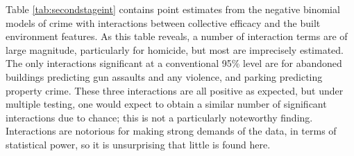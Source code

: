\documentclass [11pt, proquest] {uwthesis}[2015/03/03]
\begin{document}
\begin{longtable}[c]{|p{0.10in}|p{0.80in}|p{0.75in}|p{0.75in}|p{0.75in}|p{0.75in}|p{0.75in}}
Modern Roman})}}} & \multicolumn{1}{!{\color[HTML]{000000}\vrule width 0pt}>{\centering}p{\dimexpr 0.75in+0\tabcolsep+0\arrayrulewidth}}{\fontsize{10}{10}\selectfont{\textcolor[HTML]{000000}{\global\setmainfont{Latin Modern Roman}-0.03}}\fontsize{10}{10}\selectfont{\textcolor[HTML]{000000}{\global\setmainfont{Latin Modern Roman}\linebreak }}\fontsize{10}{10}\selectfont{\textcolor[HTML]{000000}{\global\setmainfont{Latin Modern Roman}(}}\fontsize{10}{10}\selectfont{\textcolor[HTML]{000000}{\global\setmainfont{Latin Modern Roman}0.03}}\fontsize{10}{10}\selectfont{\textcolor[HTML]{000000}{\global\setmainfont{Latin Modern Roman})}}} & \multicolumn{1}{!{\color[HTML]{000000}\vrule width 0pt}>{\centering}p{\dimexpr 0.75in+0\tabcolsep+0\arrayrulewidth}!{\color[HTML]{000000}\vrule width 0pt}}{\fontsize{10}{10}\selectfont{\textcolor[HTML]{000000}{\global\setmainfont{Latin Modern Roman}-0.03}}\fontsize{10}{10}\selectfont{\textcolor[HTML]{000000}{\global\setmainfont{Latin Modern Roman}\linebreak }}\fontsize{10}{10}\selectfont{\textcolor[HTML]{000000}{\global\setmainfont{Latin Modern Roman}(}}\fontsize{10}{10}\selectfont{\textcolor[HTML]{000000}{\global\setmainfont{Latin Modern Roman}0.02}}\fontsize{10}{10}\selectfont{\textcolor[HTML]{000000}{\global\setmainfont{Latin Modern Roman})}}} \\

\noalign{\global\setlength{\arrayrulewidth}{0.5pt}}\arrayrulecolor[HTML]{000000}\cline{1-7}

\end{longtable}
Table \ref{tab:secondstageint} contains point estimates from the negative binomial models of crime with interactions between collective efficacy and the built environment features. As this table reveals, a number of interaction terms are of large magnitude, particularly for homicide, but most are imprecisely estimated. The only interactions significant at a conventional 95\% level are for abandoned buildings predicting gun assaults and any violence, and parking predicting property crime. These three interactions are all positive as expected, but under multiple testing, one would expect to obtain a similar number of significant interactions due to chance; this is not a particularly noteworthy finding. Interactions are notorious for making strong demands of the data, in terms of statistical power, so it is unsurprising that little is found here.
\end{document}
